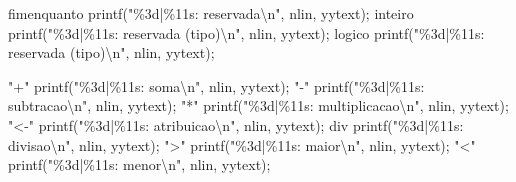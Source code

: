\documentclass[
  brazilian,
  letterpaper,
]{book}
\newenvironment{Shaded}{\begin{snugshade}}{\end{snugshade}}
\newcommand{\NormalTok}[1]{\textcolor[rgb]{0.00,0.23,0.31}{#1}}
\newcommand{\OperatorTok}[1]{\textcolor[rgb]{0.37,0.37,0.37}{#1}}
\newcommand{\SpecialCharTok}[1]{\textcolor[rgb]{0.37,0.37,0.37}{#1}}
\newcommand{\StringTok}[1]{\textcolor[rgb]{0.13,0.47,0.30}{#1}}
\theoremstyle{plain}
\theoremstyle{definition}
\theoremstyle{remark}
\begin{document}
\begin{Shaded}
\begin{Highlighting}[]
\NormalTok{fimenquanto   printf}\OperatorTok{(}\StringTok{"}\SpecialCharTok{\%3d}\StringTok{|}\SpecialCharTok{\%11s}\StringTok{: reservada}\SpecialCharTok{\textbackslash{}n}\StringTok{"}\OperatorTok{,}\NormalTok{ nlin}\OperatorTok{,}\NormalTok{ yytext}\OperatorTok{);}
\NormalTok{inteiro       printf}\OperatorTok{(}\StringTok{"}\SpecialCharTok{\%3d}\StringTok{|}\SpecialCharTok{\%11s}\StringTok{: reservada (tipo)}\SpecialCharTok{\textbackslash{}n}\StringTok{"}\OperatorTok{,}\NormalTok{ nlin}\OperatorTok{,}\NormalTok{ yytext}\OperatorTok{);}
\NormalTok{logico        printf}\OperatorTok{(}\StringTok{"}\SpecialCharTok{\%3d}\StringTok{|}\SpecialCharTok{\%11s}\StringTok{: reservada (tipo)}\SpecialCharTok{\textbackslash{}n}\StringTok{"}\OperatorTok{,}\NormalTok{ nlin}\OperatorTok{,}\NormalTok{ yytext}\OperatorTok{);}

\StringTok{"+"}\NormalTok{          printf}\OperatorTok{(}\StringTok{"}\SpecialCharTok{\%3d}\StringTok{|}\SpecialCharTok{\%11s}\StringTok{: soma}\SpecialCharTok{\textbackslash{}n}\StringTok{"}\OperatorTok{,}\NormalTok{ nlin}\OperatorTok{,}\NormalTok{ yytext}\OperatorTok{);}
\StringTok{"{-}"}\NormalTok{          printf}\OperatorTok{(}\StringTok{"}\SpecialCharTok{\%3d}\StringTok{|}\SpecialCharTok{\%11s}\StringTok{: subtracao}\SpecialCharTok{\textbackslash{}n}\StringTok{"}\OperatorTok{,}\NormalTok{ nlin}\OperatorTok{,}\NormalTok{ yytext}\OperatorTok{);}
\StringTok{"*"}\NormalTok{          printf}\OperatorTok{(}\StringTok{"}\SpecialCharTok{\%3d}\StringTok{|}\SpecialCharTok{\%11s}\StringTok{: multiplicacao}\SpecialCharTok{\textbackslash{}n}\StringTok{"}\OperatorTok{,}\NormalTok{ nlin}\OperatorTok{,}\NormalTok{ yytext}\OperatorTok{);}
\StringTok{"\textless{}{-}"}\NormalTok{         printf}\OperatorTok{(}\StringTok{"}\SpecialCharTok{\%3d}\StringTok{|}\SpecialCharTok{\%11s}\StringTok{: atribuicao}\SpecialCharTok{\textbackslash{}n}\StringTok{"}\OperatorTok{,}\NormalTok{ nlin}\OperatorTok{,}\NormalTok{ yytext}\OperatorTok{);}
\NormalTok{div          printf}\OperatorTok{(}\StringTok{"}\SpecialCharTok{\%3d}\StringTok{|}\SpecialCharTok{\%11s}\StringTok{: divisao}\SpecialCharTok{\textbackslash{}n}\StringTok{"}\OperatorTok{,}\NormalTok{ nlin}\OperatorTok{,}\NormalTok{ yytext}\OperatorTok{);}
\StringTok{"\textgreater{}"}\NormalTok{          printf}\OperatorTok{(}\StringTok{"}\SpecialCharTok{\%3d}\StringTok{|}\SpecialCharTok{\%11s}\StringTok{: maior}\SpecialCharTok{\textbackslash{}n}\StringTok{"}\OperatorTok{,}\NormalTok{ nlin}\OperatorTok{,}\NormalTok{ yytext}\OperatorTok{);}
\StringTok{"\textless{}"}\NormalTok{          printf}\OperatorTok{(}\StringTok{"}\SpecialCharTok{\%3d}\StringTok{|}\SpecialCharTok{\%11s}\StringTok{: menor}\SpecialCharTok{\textbackslash{}n}\StringTok{"}\OperatorTok{,}\NormalTok{ nlin}\OperatorTok{,}\NormalTok{ yytext}\OperatorTok{);}

\end{Highlighting}
\end{Shaded}
\end{document}
